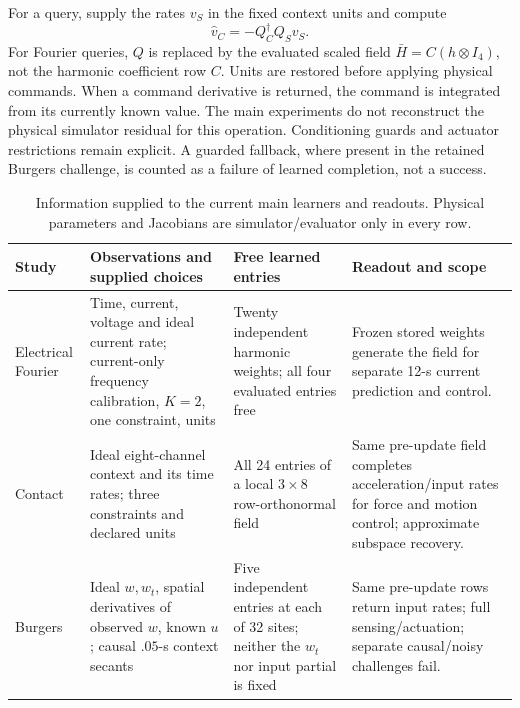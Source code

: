 For a query, supply the rates $v_S$ in the fixed context units and compute
\begin{equation}
 \widehat v_C=-Q_C^\dagger Q_Sv_S.
 \label{eq:direct_common_readout}
\end{equation}
For Fourier queries, $Q$ is replaced by the evaluated scaled field
$\bar H=C(h\otimes I_4)$, not the harmonic coefficient row $C$.
Units are restored before applying physical commands. When a command derivative
is returned, the command is integrated from its currently known value.
The main experiments do not reconstruct the physical simulator residual
for this operation. Conditioning guards and actuator restrictions remain
explicit. A guarded fallback, where present in the retained Burgers
challenge, is counted as a failure of learned completion, not a success.

\begin{table}[t]
\centering
\caption{Information supplied to the current main learners and readouts.
Physical parameters and Jacobians are simulator/evaluator only in every row.}
\begin{tabular}{p{}p{}p{}p{}}
\toprule Study & Observations and supplied choices & Free learned entries & Readout and scope \\
\midrule
Electrical Fourier & Time, current, voltage and ideal current rate; current-only frequency calibration, $K=2$, one constraint, units & Twenty independent harmonic weights; all four evaluated entries free & Frozen stored weights generate the field for separate 12-s current prediction and control. \\
Contact & Ideal eight-channel context and its time rates; three constraints and declared units & All 24 entries of a local $3\times8$ row-orthonormal field & Same pre-update field completes acceleration/input rates for force and motion control; approximate subspace recovery. \\
Burgers & Ideal $w,w_t$, spatial derivatives of observed $w$, known $u$; causal $.05$-s context secants & Five independent entries at each of 32 sites; neither the $w_t$ nor input partial is fixed & Same pre-update rows return input rates; full sensing/actuation; separate causal/noisy challenges fail. \\
\bottomrule
\end{tabular}
\label{tab:direct_information}
\end{table}

